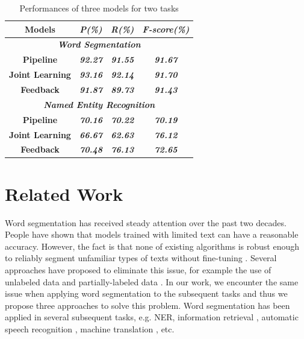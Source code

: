 \documentclass[conference]{IEEEtran}
\begin{document}
\begin{table}[htbp]
\caption{Performances of three models for two tasks}
\begin{center}
\begin{tabular}{|c|c|c|c|}
\hline
\textbf{Models} & \textbf{\textit{P(\%)}}& \textbf{\textit{R(\%)}}& \textbf{\textit{F-score(\%)}} \\
\hline
\multicolumn{4}{|c|}{\textbf{\textit{Word Segmentation}}}\\
\hline
\textbf{Pipeline} & \textbf{\textit{92.27}}& \textbf{\textit{91.55}}& \textbf{\textit{91.67}} \\
\hline
\textbf{Joint Learning} & \textbf{\textit{93.16}}& \textbf{\textit{92.14}}& \textbf{\textit{91.70}} \\
\hline
\textbf{Feedback} & \textbf{\textit{91.87}}& \textbf{\textit{89.73}}& \textbf{\textit{91.43}} \\
\hline
\multicolumn{4}{|c|}{\textbf{\textit{Named Entity Recognition}}}\\
\hline
\textbf{Pipeline} & \textbf{\textit{70.16}}& \textbf{\textit{70.22}}& \textbf{\textit{70.19}} \\
\hline
\textbf{Joint Learning} & \textbf{\textit{66.67}}& \textbf{\textit{62.63}}& \textbf{\textit{76.12}} \\
\hline
\textbf{Feedback} & \textbf{\textit{70.48}}& \textbf{\textit{76.13}}& \textbf{\textit{72.65}} \\
\hline
\end{tabular}
\label{tab1}
\end{center}
\end{table}

\section{Related Work}
Word segmentation has received steady attention over the past two decades. People have shown that models trained with limited text can have a reasonable accuracy\cite{b22, b23}. However, the fact is that none of existing algorithms is robust enough to reliably segment unfamiliar types of texts without fine-tuning \cite{nn}. Several approaches have proposed to eliminate this issue, for example the use of unlabeled data \cite{nn} and partially-labeled data \cite{nn}. In our work, we encounter the same issue when applying word segmentation to the subsequent tasks and thus we propose three approaches to solve this problem. Word segmentation has been applied in several subsequent tasks, e.g. NER\cite{nn}, information retrieval \cite{nn}, automatic speech recognition \cite{nn}, machine translation \cite{nn}, etc. 
\end{document}
